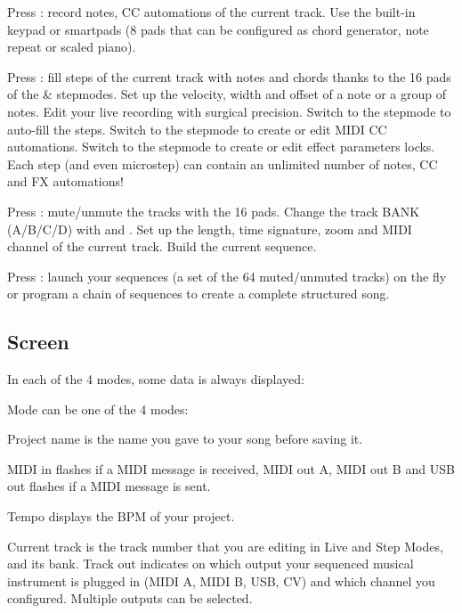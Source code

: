 Press : record notes, CC automations of the current track. Use the built-in keypad or smartpads (8 pads that can be configured as chord generator, note repeat or scaled piano).


Press : fill steps of the current track with notes and chords thanks to the 16 pads of the  \&  stepmodes. Set up the velocity, width and offset of a note or a group of notes. Edit your live recording with surgical precision. Switch to the  stepmode to auto-fill the steps. Switch to the  stepmode to create or edit MIDI CC automations. Switch to the  stepmode to create or edit effect parameters locks. Each step (and even microstep) can contain an unlimited number of notes, CC and FX automations!


Press : mute/unmute the tracks with the 16 pads. Change the track BANK (A/B/C/D) with \btn{<} and \btn{>}. Set up the length, time signature, zoom and MIDI channel of the current track. Build the current sequence.


Press : launch your sequences (a set of the 64 muted/unmuted tracks) on the fly or program a chain of sequences to create a complete structured song.



\subsection{Screen}

In each of the 4 modes, some data is always displayed:


\textcolor{pygreen}{Mode} can be one of the 4 modes:    

\textcolor{pygreen}{Project name} is the name you gave to your song before saving it.

\textcolor{pygreen}{MIDI in} flashes if a MIDI message is received, \textcolor{pygreen}{MIDI out A}, \textcolor{pygreen}{MIDI out B} and \textcolor{pygreen}{USB out} flashes if a MIDI message is sent.

\textcolor{pygreen}{Tempo} displays the BPM of your project.

\textcolor{pyred}{Current track} is the track number that you are editing in Live and Step Modes, and its bank. \textcolor{pyred}{Track out} indicates on which output your sequenced musical instrument is plugged in (MIDI A, MIDI B, USB, CV) and which channel you configured. Multiple outputs can be selected.


